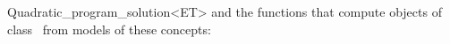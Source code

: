 \begin{ccRefClass}{Quadratic_program_solution<ET>}
and the functions that compute objects of class \ccRefName\ from
models of these concepts:

\\
\\
\\
\end{ccRefClass}
